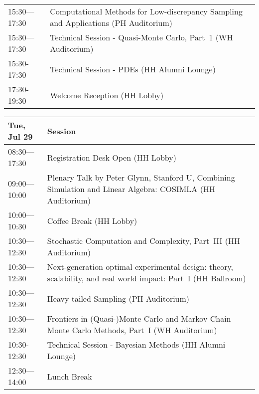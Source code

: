 \begin{table}
{\begin{tabularx}{\textwidth}{>{\hsize=0.32\hsize}X|>{\hsize=1.7\hsize}X}
\cellcolor{\SessionTitleColor}15:30---17:30 & \cellcolor{\SessionTitleColor}Computational Methods for Low-discrepancy Sampling and Applications (PH Auditorium) \\
\cellcolor{\SessionLightColor}15:30---17:30 & \cellcolor{\SessionLightColor}Technical Session - Quasi-Monte Carlo, Part~1 (WH Auditorium) \\
\cellcolor{\SessionLightColor}15:30-17:30 & \cellcolor{\SessionLightColor}Technical Session - PDEs (HH Alumni Lounge) \\
\cellcolor{\EmptyColor}17:30-19:30 & \cellcolor{\EmptyColor}Welcome Reception (HH Lobby) \\
\hline
\end{tabularx}
}
\end{table}

\begin{table}
{\footnotesize
\begin{tabularx}{\textwidth}{>{\hsize=0.32\hsize}X|>{\hsize=1.7\hsize}X}
\hline
\textbf{Tue, Jul 29} & \textbf{Session} \\
\hline
\cellcolor{\EmptyColor}08:30---17:30 & \cellcolor{\EmptyColor}Registration Desk Open (HH Lobby) \\
\cellcolor{\PlenaryColor}09:00---10:00 & \cellcolor{\PlenaryColor}Plenary Talk by Peter Glynn, Stanford U, Combining Simulation and Linear Algebra: COSIMLA (HH Auditorium) \\
\cellcolor{\EmptyColor}10:00---10:30 & \cellcolor{\EmptyColor}Coffee Break (HH Lobby) \\
\cellcolor{\SessionTitleColor}10:30---12:30 & \cellcolor{\SessionTitleColor}Stochastic Computation and Complexity, Part~III (HH Auditorium) \\
\cellcolor{\SessionTitleColor}10:30---12:30 & \cellcolor{\SessionTitleColor}Next-generation optimal experimental design: theory, scalability, and real world impact: Part~I (HH Ballroom) \\
\cellcolor{\SessionTitleColor}10:30---12:30 & \cellcolor{\SessionTitleColor}Heavy-tailed Sampling (PH Auditorium) \\
\cellcolor{\SessionTitleColor}10:30---12:30 & \cellcolor{\SessionTitleColor}Frontiers in (Quasi-)Monte Carlo and Markov Chain Monte Carlo Methods, Part~I (WH Auditorium) \\
\cellcolor{\SessionLightColor}10:30-12:30 & \cellcolor{\SessionLightColor}Technical Session - Bayesian Methods (HH Alumni Lounge) \\
\cellcolor{\EmptyColor}12:30---14:00 & \cellcolor{\EmptyColor}Lunch Break \\

\end{tabularx}}
\end{table}
